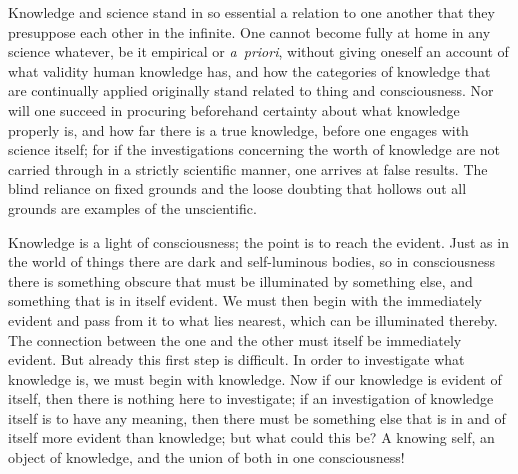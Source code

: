 \documentclass[12pt]{book}
\begin{document}
Knowledge and science stand in so essential a relation to one another that
they presuppose each other in the infinite. One cannot become fully at home
in any science whatever, be it empirical or \textit{a~priori}, without
giving oneself an account of what validity human knowledge has, and how the
categories of knowledge that are continually applied originally stand related
to thing and consciousness. Nor will one succeed in procuring beforehand
certainty about what knowledge properly is, and how far there is a true
knowledge, before one engages with science itself; for if the investigations
concerning the worth of knowledge are not carried through in a strictly
scientific manner, one arrives at false results. The blind reliance on fixed
grounds and the loose doubting that hollows out all grounds are examples of
the unscientific.

Knowledge is a light of consciousness; the point is to reach the evident.
Just as in the world of things there are dark and self-luminous bodies, so in
consciousness there is something obscure that must be illuminated by
something else, and something that is in itself evident. We must then begin
with the immediately evident and pass from it to what lies nearest, which can
be illuminated thereby. The connection between the one and the other must
itself be immediately evident. But already this first step is difficult. In
order to investigate what knowledge is, we must begin with knowledge. Now if
our knowledge is evident of itself, then there is nothing here to
investigate; if an investigation of knowledge itself is to have any meaning,
then there must be something else that is in and of itself more evident than
knowledge; but what could this be? A knowing self, an object of knowledge,
and the union of both in one consciousness!
\end{document}
